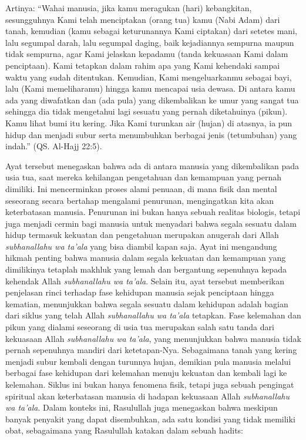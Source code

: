     Artinya: “Wahai manusia, jika kamu meragukan (hari) kebangkitan, sesungguhnya Kami telah menciptakan (orang tua) kamu (Nabi Adam) dari tanah, kemudian (kamu sebagai keturunannya Kami ciptakan) dari setetes mani, lalu segumpal darah, lalu segumpal daging, baik kejadiannya sempurna maupun tidak sempurna, agar Kami jelaskan kepadamu (tanda kekuasaan Kami dalam penciptaan). Kami tetapkan dalam rahim apa yang Kami kehendaki sampai waktu yang sudah ditentukan. Kemudian, Kami mengeluarkanmu sebagai bayi, lalu (Kami memeliharamu) hingga kamu mencapai usia dewasa. Di antara kamu ada yang diwafatkan dan (ada pula) yang dikembalikan ke umur yang sangat tua sehingga dia tidak mengetahui lagi sesuatu yang pernah diketahuinya (pikun). Kamu lihat bumi itu kering. Jika Kami turunkan air (hujan) di atasnya, ia pun hidup dan menjadi subur serta menumbuhkan berbagai jenis (tetumbuhan) yang indah.” (QS. Al-Hajj 22:5).

    Ayat tersebut menegaskan bahwa ada di antara manusia yang dikembalikan pada usia tua, saat mereka kehilangan pengetahuan dan kemampuan yang pernah dimiliki. Ini mencerminkan proses alami penuaan, di mana fisik dan mental seseorang secara bertahap mengalami penurunan, mengingatkan kita akan keterbatasan manusia. Penurunan ini bukan hanya sebuah realitas biologis, tetapi juga menjadi cermin bagi manusia untuk menyadari bahwa segala sesuatu dalam hidup termasuk kekuatan dan pengetahuan merupakan anugerah dari Allah \textit{subhanallahu wa ta'ala} yang bisa diambil kapan saja. Ayat ini mengandung hikmah penting bahwa manusia dalam segala kekuatan dan kemampuan yang dimilikinya tetaplah makhluk yang lemah dan bergantung sepenuhnya kepada kehendak Allah \textit{subhanallahu wa ta'ala}. Selain itu, ayat tersebut memberikan penjelasan rinci terhadap fase kehidupan manusia sejak penciptaan hingga kematian, menunjukkan bahwa segala sesuatu dalam kehidupan adalah bagian dari siklus yang telah Allah \textit{subhanallahu wa ta'ala} tetapkan. Fase kelemahan dan pikun yang dialami seseorang di usia tua merupakan salah satu tanda dari kekuasaan Allah \textit{subhanallahu wa ta'ala}, yang menunjukkan bahwa manusia tidak pernah sepenuhnya mandiri dari ketetapan-Nya. Sebagaimana tanah yang kering menjadi subur kembali dengan turunnya hujan, demikian pula manusia melalui berbagai fase kehidupan dari kelemahan menuju kekuatan dan kembali lagi ke kelemahan. Siklus ini bukan hanya fenomena fisik, tetapi juga sebuah pengingat spiritual akan keterbatasan manusia di hadapan kekuasaan Allah \textit{subhanallahu wa ta'ala}. Dalam konteks ini, Rasulullah juga menegaskan bahwa meskipun banyak penyakit yang dapat disembuhkan, ada satu kondisi yang tidak memiliki obat, sebagaimana yang Rasulullah katakan dalam sebuah hadits:

